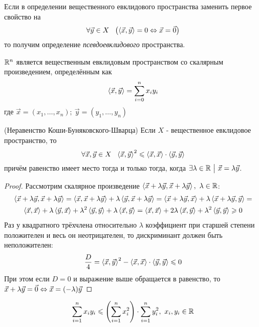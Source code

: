 \begin{addition}
	Если в определении вещественного евклидового пространства заменить первое свойство на
	\[
	\forall \vec{y} \in X\ \ \left(\trbr{\vec{x}, \vec{y}} = 0 \lra \vec{x} = \vec{0}\right)
	\]
	то получим определение \textit{псевдоевклидового} пространства.
\end{addition}

\begin{lemma}
	$\mathbb{R}^n$ является вещественным евклидовым пространством со скалярным произведением, определённым как
	\[
		\left\langle\vec{x}, \vec{y}\right\rangle = \sum\limits_{i = 0}^n x_iy_i
	\]
	где $\vec{x} = (x_1, \ldots, x_n);\ \vec{y} = (y_1, \ldots, y_n)$
\end{lemma}

\begin{theorem} (Неравенство Коши-Буняковского-Шварца)
	Если $X$ - вещественное евклидовое пространство, то
	\[
		\forall \vec{x}, \vec{y} \in X\ \ \left\langle\vec{x}, \vec{y}\right\rangle^2 \leqslant \left\langle\vec{x}, \vec{x}\right\rangle \cdot \left\langle\vec{y}, \vec{y}\right\rangle
	\]
	причём равенство имеет место тогда и только тогда, когда $\exists \lambda \in \mathbb{R} \ \big|\  \vec{x} = \lambda \vec{y}$.
\end{theorem}

\begin{proof}
	Рассмотрим скалярное произведение $\left\langle\vec{x} + \lambda \vec{y}, \vec{x} + \lambda \vec{y}\right\rangle,\ \lambda \in \mathbb{R}$:
	\begin{multline*}
		\left\langle\vec{x} + \lambda \vec{y}, \vec{x} + \lambda \vec{y}\right\rangle = \left\langle\vec{x}, \vec{x} + \lambda\vec{y}\right\rangle + \lambda\left\langle\vec{y}, \vec{x} + \lambda\vec{y}\right\rangle = \left\langle\vec{x} + \lambda\vec{y}, \vec{x}\right\rangle + \lambda\left\langle\vec{x} + \lambda\vec{y}, \vec{y}\right\rangle =
		\\
		\left\langle\vec{x}, \vec{x}\right\rangle + \lambda\left\langle\vec{y}, \vec{x}\right\rangle + \lambda^2\left\langle\vec{y}, \vec{y}\right\rangle + \lambda\left\langle\vec{x}, \vec{y}\right\rangle = \left\langle\vec{x}, \vec{x}\right\rangle + 2\lambda\left\langle\vec{x}, \vec{y}\right\rangle + \lambda^2\left\langle\vec{y}, \vec{y}\right\rangle \geqslant 0
	\end{multline*}
	Раз у квадратного трёхчлена относительно $\lambda$ коэффициент при старшей степени положителен и весь он неотрицателен, то дискриминант должен быть неположителен:
	\[
		\frac{D}{4} = \left\langle\vec{x}, \vec{y}\right\rangle^2 - \left\langle\vec{x}, \vec{x}\right\rangle \cdot \left\langle\vec{y}, \vec{y}\right\rangle \leqslant 0
	\]
	При этом если $D = 0$ и выражение выше обращается в равенство, то $\vec{x} + \lambda\vec{y} = \vec{0} \Leftrightarrow \vec{x} = (-\lambda)\vec{y}$
\end{proof}

\begin{corollary}
	\[
		\sum\limits_{i = 1}^n x_i y_i \leqslant \left(\sum\limits_{i = 1}^n x_i^2\right) \cdot \sum\limits_{i = 1}^n y_i^2,\ x_i, y_i \in \mathbb{R}
	\]
\end{corollary}

